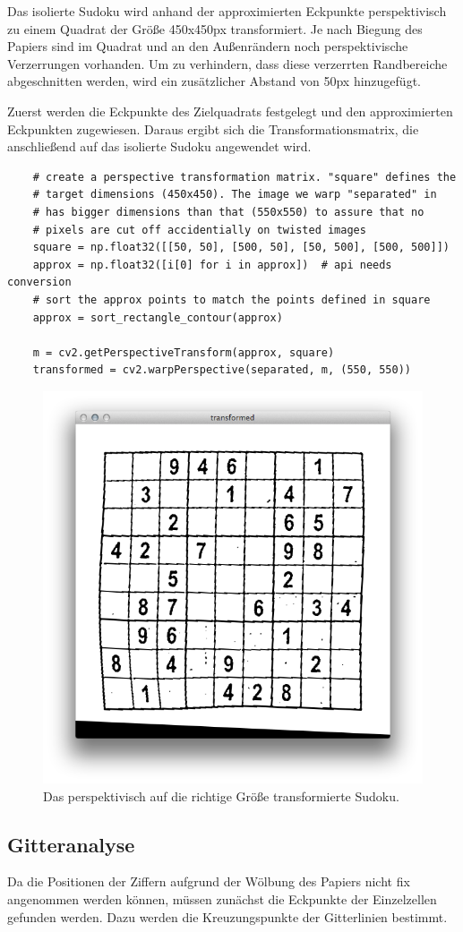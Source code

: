 Das isolierte Sudoku wird anhand der approximierten Eckpunkte perspektivisch zu einem Quadrat der Größe 450x450px transformiert.
Je nach Biegung des Papiers sind im Quadrat und an den Außenrändern noch perspektivische Verzerrungen vorhanden. Um zu verhindern, dass diese verzerrten Randbereiche abgeschnitten werden, wird ein zusätzlicher Abstand von 50px hinzugefügt.

Zuerst werden die Eckpunkte des Zielquadrats festgelegt und den approximierten Eckpunkten zugewiesen. Daraus ergibt sich die Transformationsmatrix, die anschließend auf das isolierte Sudoku angewendet wird.

\begin{lstlisting}
    # create a perspective transformation matrix. "square" defines the
    # target dimensions (450x450). The image we warp "separated" in
    # has bigger dimensions than that (550x550) to assure that no
    # pixels are cut off accidentially on twisted images
    square = np.float32([[50, 50], [500, 50], [50, 500], [500, 500]])
    approx = np.float32([i[0] for i in approx])  # api needs conversion
    # sort the approx points to match the points defined in square
    approx = sort_rectangle_contour(approx)

    m = cv2.getPerspectiveTransform(approx, square)
    transformed = cv2.warpPerspective(separated, m, (550, 550))
\end{lstlisting}

\begin{figure}[H]
    \begin{center}
        \includegraphics[width=.5\textwidth]{Abbildungen/transformed}
    \end{center}
    \caption{Das perspektivisch auf die richtige Größe transformierte Sudoku.}
\end{figure}


\subsection{Gitteranalyse}
Da die Positionen der Ziffern aufgrund der Wölbung des Papiers nicht fix angenommen werden können, müssen zunächst die Eckpunkte der Einzelzellen gefunden werden.
Dazu werden die Kreuzungspunkte der Gitterlinien bestimmt.

